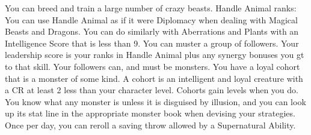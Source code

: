 \skillfeat
{You can breed and train a large number of crazy beasts.}
{Handle Animal ranks:}
{You can use Handle Animal as if it were Diplomacy when dealing with Magical Beasts and Dragons. You can do similarly with Aberrations and Plants with an Intelligence Score that is less than 9.}
{You can muster a group of followers. Your leadership score is your ranks in Handle Animal plus any synergy bonuses you gt to that skill. Your followers can, and must be monsters.}
{You have a loyal cohort that is a monster of some kind. A cohort is an intelligent and loyal creature with a CR at least 2 less than your character level. Cohorts gain levels when you do.}
{You know what any monster is unless it is disguised by illusion, and you can look up its stat line in the appropriate monster book when devising your strategies.}
{Once per day, you can reroll a saving throw allowed by a Supernatural Ability.}